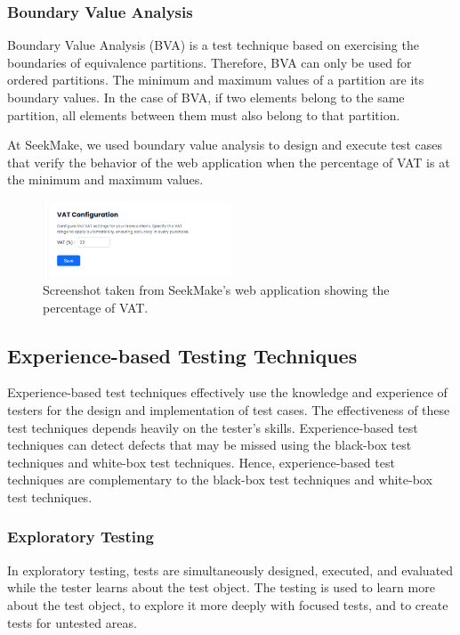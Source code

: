 \subsubsection{Boundary Value Analysis}
Boundary Value Analysis (BVA) is a test technique based on exercising the boundaries of equivalence
partitions. Therefore, BVA can only be used for ordered partitions. The minimum and maximum values of
a partition are its boundary values. In the case of BVA, if two elements belong to the same partition, all
elements between them must also belong to that partition. \cite{istqbctfl4.0.1}

At SeekMake, we used boundary value analysis to design and execute test cases that verify the behavior of the web application when the percentage of VAT is at the minimum and maximum values.

\begin{figure}[H]
    \centering
    \includegraphics[width=0.5\textwidth]{project/images/bva.png}
    \caption{Screenshot taken from SeekMake's web application showing the percentage of VAT.}
    \label{fig:bva}
\end{figure}

\subsection{Experience-based Testing Techniques}
Experience-based test techniques effectively use the knowledge and experience of testers for the
design and implementation of test cases. The effectiveness of these test techniques depends heavily on
the tester’s skills. Experience-based test techniques can detect defects that may be missed using the
black-box test techniques and white-box test techniques. Hence, experience-based test techniques are
complementary to the black-box test techniques and white-box test techniques. \cite{istqbctfl4.0.1}

\subsubsection{Exploratory Testing}
In exploratory testing, tests are simultaneously designed, executed, and evaluated while the tester learns
about the test object. The testing is used to learn more about the test object, to explore it more deeply
with focused tests, and to create tests for untested areas. \cite{istqbctfl4.0.1}

